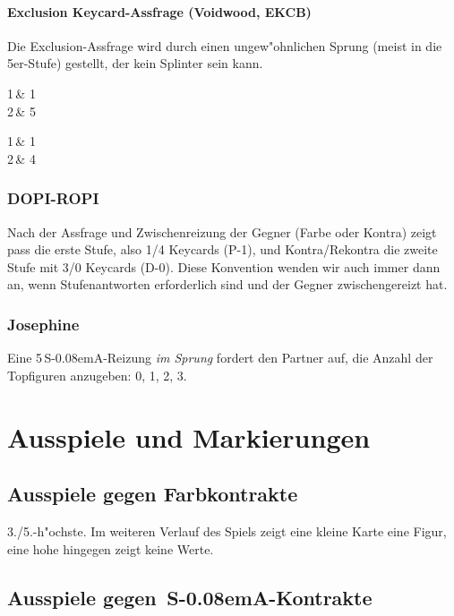 \documentclass[11pt,german,twocolumn]{scrartcl}
\renewcommand{\Cl}{{\color{ClColor}{\clubs}}}
\renewcommand{\Di}{{\color{DiColor}{\sdiamonds}}}
\renewcommand{\He}{{\color{HeColor}{\shearts}}}
\renewcommand{\Sp}{{\color{SpColor}{\spades}}}
\def\pik{\,\Sp}
\def\coe{\,\He}
\def\kar{\,\Di}
\def\tre{\,\Cl}
\def\sa{\textsf{S\kern-0.08emA}}
\def\SA{\,\sa}
\begin{document}
\paragraph{Exclusion Keycard-Assfrage (Voidwood, EKCB)}

Die Exclusion-Assfrage wird durch einen ungew"ohnlichen Sprung
(meist in die 5er-Stufe) gestellt, der kein Splinter sein kann.

{
  1\coe & 1\pik \\
  2\coe & 5\tre{}
}
{
}

{
  1\tre & 1\kar \\
  2\kar & 4\coe{}
}
{
}

\subsubsection{DOPI-ROPI}

Nach der Assfrage und Zwischenreizung der Gegner (Farbe oder Kontra) zeigt pass
die erste Stufe, also 1/4 Keycards (P-1), und Kontra/Rekontra die zweite Stufe
mit 3/0 Keycards (D-0). Diese Konvention wenden wir auch immer dann an, wenn
Stufenantworten erforderlich sind und der Gegner zwischengereizt hat.

\subsubsection{Josephine}

Eine 5\SA-Reizung \emph{im Sprung} fordert den Partner auf, die Anzahl der
Topfiguren anzugeben: 0, 1, 2, 3.

\section{Ausspiele und Markierungen}

\subsection{Ausspiele gegen Farbkontrakte}

3./5.-h"ochste. Im weiteren Verlauf des Spiels zeigt eine kleine Karte eine
Figur, eine hohe hingegen zeigt keine Werte.

\subsection{Ausspiele gegen \SA-Kontrakte}
\end{document}
